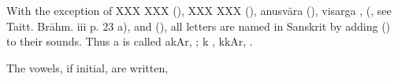 \s With the exception of  XXX XXX (),  XXX XXX (), anusvāra
{\dn {\rs -\re}\2}  (), visarga {\dn ,}  (,
see Taitt. Brāhm. iii p. 23 a), and  (), all
letters are named in Sanskrit by adding  () to
their sounds. Thus {\dn a}  is called {\dn akAr,} ; {\dn k}
, {\dn kkAr,} .

\s The vowels, if initial, are written,
